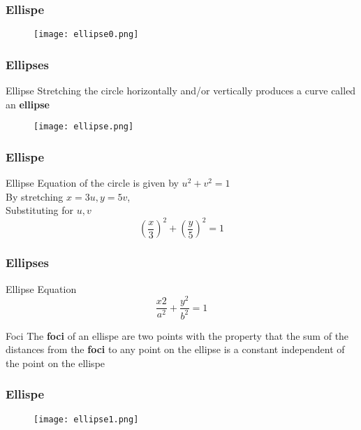  \begin{frame}
  \frametitle{Ellispe}
  \begin{figure}
    \centering
    \texttt{[image: ellipse0.png]}
  \end{figure}
 \end{frame}


 \begin{frame}
  \frametitle{Ellipses}
  \begin{block}{Ellipse}
    Stretching the circle horizontally and/or vertically produces a curve called an \textbf{ellipse}
  \end{block}
  \begin{figure}
    \centering 
    \texttt{[image: ellipse.png]}
  \end{figure}
 \end{frame}
 


 \begin{frame}
  \frametitle{Ellispe}
\begin{exampleblock}{Ellipse}
  Equation of the circle is given by \(u^{2} + v^{2} = 1\) \\
  By stretching \(x = 3u, y = 5v\), \\ Substituting for \(u,v\)  
  \[ \left( \frac{x}{3} \right)^{2} + \left(\frac{y}{5}\right)^{2} = 1 \]
\end{exampleblock} 
 
 \end{frame}
 \begin{frame}
  \frametitle{Ellipses}
  \begin{block}{Ellipse Equation}
    \[\frac{x{2}}{a^{2}} + \frac{y^{2}}{b^{2}} = 1 \] 
  \end{block}
  \begin{block}{Foci}
The \textbf{foci} of an ellispe are two points with the property that the
sum of the distances from the \textbf{foci} to any point on the ellipse is a constant independent of the point on the ellispe    
  \end{block} 
 
 \end{frame}

 \begin{frame}
  \frametitle{Ellispe}
  \begin{figure}
    \centering
    \texttt{[image: ellipse1.png]}
  \end{figure}
 \end{frame}

